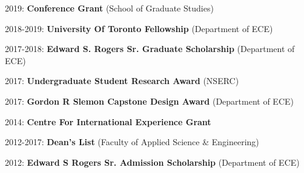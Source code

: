 \documentclass[12pt]{cv_style}
\begin{document}
\begin{ditem}
	\item 2019: \textbf{Conference Grant} (School of Graduate Studies)
	\item 2018-2019: \textbf{University Of Toronto Fellowship} (Department of ECE)
	\item 2017-2018: \textbf{Edward S. Rogers Sr. Graduate Scholarship} (Department of ECE)
	\item 2017: \textbf{Undergraduate Student Research Award} (NSERC)
	\item 2017: \textbf{Gordon R Slemon Capstone Design Award} (Department of ECE)
	\item 2014: \textbf{Centre For International Experience Grant}
	\item 2012-2017: \textbf{Dean's List} (Faculty of Applied Science \& Engineering)
	\item 2012: \textbf{Edward S Rogers Sr. Admission Scholarship} (Department of ECE)
\end{ditem}
\end{document}
